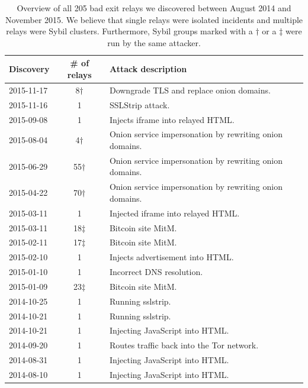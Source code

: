 \begin{table}[t]
\centering
\begin{tabular}{l c p{4cm}}
\textbf{Discovery} & \textbf{\# of relays} & \textbf{Attack description} \\
\hline
2015-11-17 & 8$\dagger$ & Downgrade TLS and replace onion domains. \\
2015-11-16 & 1 & SSLStrip attack. \\
2015-09-08 & 1 & Injects iframe into relayed HTML. \\
2015-08-04 & 4$\dagger$ & Onion service impersonation by rewriting onion domains. \\
2015-06-29 & 55$\dagger$ & Onion service impersonation by rewriting onion domains. \\
2015-04-22 & 70$\dagger$ & Onion service impersonation by rewriting onion domains. \\
2015-03-11 & 1 & Injected iframe into relayed HTML. \\
2015-03-11 & 18$\ddagger$ & Bitcoin site MitM. \\
2015-02-11 & 17$\ddagger$ & Bitcoin site MitM. \\
2015-02-10 & 1 & Injects advertisement into HTML. \\
2015-01-10 & 1 & Incorrect DNS resolution. \\
2015-01-09 & 23$\ddagger$ & Bitcoin site MitM. \\
2014-10-25 & 1 & Running sslstrip. \\
2014-10-21 & 1 & Running sslstrip. \\
2014-10-21 & 1 & Injecting JavaScript into HTML. \\
2014-09-20 & 1 & Routes traffic back into the Tor network. \\
2014-08-31 & 1 & Injecting JavaScript into HTML. \\
2014-08-10 & 1 & Injecting JavaScript into HTML. \\
\end{tabular}
\caption{Overview of all 205 bad exit relays we discovered between August 2014
	and November 2015.  We believe that single relays were isolated incidents
	and multiple relays were Sybil clusters.  Furthermore, Sybil groups marked
	with a $\dagger$ or a $\ddagger$ were run by the same attacker.}
\label{tab:exitmap-dataset}
\end{table}

